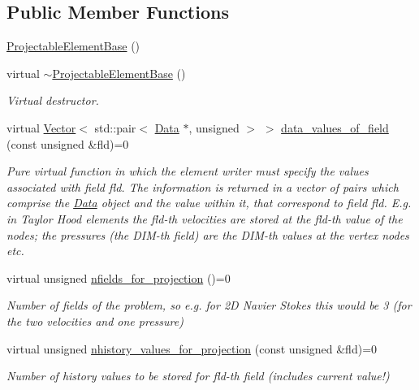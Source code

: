 \subsection*{Public Member Functions}
\begin{DoxyCompactItemize}
\item 
\hyperlink{classoomph_1_1ProjectableElementBase_a7ee05f9195757b46b3693786cd260ac5}{Projectable\+Element\+Base} ()
\item 
virtual \hyperlink{classoomph_1_1ProjectableElementBase_a668500db9bcaab7aa983d3c92f94e34b}{$\sim$\+Projectable\+Element\+Base} ()
\begin{DoxyCompactList}\small\item\em Virtual destructor. \end{DoxyCompactList}\item 
virtual \hyperlink{classoomph_1_1Vector}{Vector}$<$ std\+::pair$<$ \hyperlink{classoomph_1_1Data}{Data} $\ast$, unsigned $>$ $>$ \hyperlink{classoomph_1_1ProjectableElementBase_a644306ebdf16f334344c2d27d72f18b7}{data\+\_\+values\+\_\+of\+\_\+field} (const unsigned \&fld)=0
\begin{DoxyCompactList}\small\item\em Pure virtual function in which the element writer must specify the values associated with field fld. The information is returned in a vector of pairs which comprise the \hyperlink{classoomph_1_1Data}{Data} object and the value within it, that correspond to field fld. E.\+g. in Taylor Hood elements the fld-\/th velocities are stored at the fld-\/th value of the nodes; the pressures (the D\+I\+M-\/th field) are the D\+I\+M-\/th values at the vertex nodes etc. \end{DoxyCompactList}\item 
virtual unsigned \hyperlink{classoomph_1_1ProjectableElementBase_a44634aa4049332a580d249c25564638c}{nfields\+\_\+for\+\_\+projection} ()=0
\begin{DoxyCompactList}\small\item\em Number of fields of the problem, so e.\+g. for 2D Navier Stokes this would be 3 (for the two velocities and one pressure) \end{DoxyCompactList}\item 
virtual unsigned \hyperlink{classoomph_1_1ProjectableElementBase_ac6790f394630b964663281f8740f43a5}{nhistory\+\_\+values\+\_\+for\+\_\+projection} (const unsigned \&fld)=0
\begin{DoxyCompactList}\small\item\em Number of history values to be stored for fld-\/th field (includes current value!) \end{DoxyCompactList}\item 

\end{DoxyCompactItemize}
